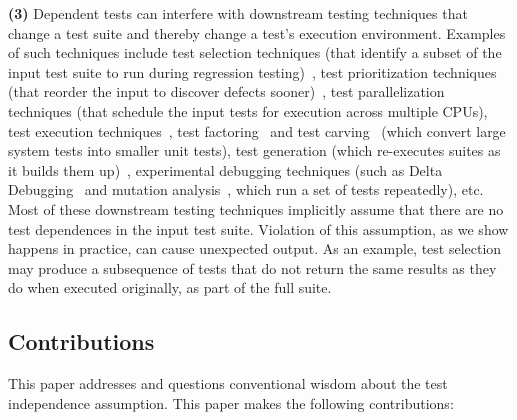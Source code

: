 \textbf{(3)}
Dependent tests can interfere with downstream testing
techniques that change a test suite and thereby change a test's execution environment.
Examples of such techniques include
test selection techniques (that identify a subset of
the input test suite to run during
regression testing)~\cite{harroldetal:OOPSLA:2001},
test prioritization techniques (that reorder the
input to discover defects sooner)~\cite{Elbaum:2000:PTC:347324.348910},
test parallelization techniques (that schedule the input tests for execution across multiple
CPUs), test execution techniques~\cite{Misailovic:2007, SPLAT},
test factoring~\cite{Saff:2005} and test carving~\cite{Elbaum:2006} (which
convert large system tests into smaller unit tests),
test generation (which re-executes suites as it builds them up)~\cite{PachecoE2005,RobinsonEPAL2011},
experimental debugging techniques (such as Delta
Debugging~\cite{Zeller:2002} and mutation analysis~\cite{Schuler:2009:EMT},
which run a set of tests repeatedly), etc. 
Most of these downstream testing techniques implicitly assume that
there are no test dependences in the input test suite. Violation of
this assumption, as we show happens in practice, can cause unexpected
output. %
As an example, test selection may produce a subsequence of tests that do not
return the same results as they do when executed originally, as part of the full suite.


\subsection{Contributions}
\label{sec:contributions}

This paper addresses and questions
conventional wisdom about the test independence assumption. 
This paper makes the following contributions:

